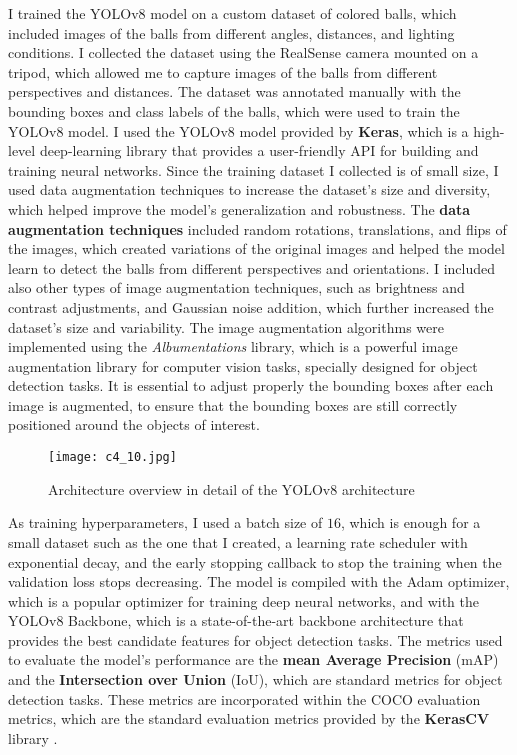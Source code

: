 I trained the YOLOv8 model on a custom dataset of colored balls, which included images of the balls
from different angles, distances, and lighting conditions. I collected the dataset using the RealSense camera mounted
on a tripod, which allowed me to capture images of the balls from different perspectives and distances. The dataset
was annotated manually with the bounding boxes and class labels of the balls, which were used to train the YOLOv8 model.
I used the YOLOv8 model provided by \textbf{Keras}, which is a high-level deep-learning library that provides a user-friendly
API for building and training neural networks. Since the training dataset I collected is of small size,
I used data augmentation techniques to increase the dataset's size and diversity, which helped improve the model's
generalization and robustness. The \textbf{data augmentation techniques} included random rotations, translations, and flips
of the images, which created variations of the original images and helped the model learn to detect the balls
from different perspectives and orientations. I included also other types of image augmentation techniques, such as
brightness and contrast adjustments, and Gaussian noise addition, which further increased the dataset's
size and variability. The image augmentation algorithms were implemented using the \textit{Albumentations} library,
which is a powerful image augmentation library for computer vision tasks, specially designed for 
object detection tasks. It is essential to adjust properly the bounding boxes after each image
is augmented, to ensure that the bounding boxes are still correctly positioned around the objects of interest.

\begin{figure}[t]
    \centering
    \texttt{[image: c4\_10.jpg]}
    \caption{Architecture overview in detail of the YOLOv8 architecture}
    \label{fig:yolov8}
\end{figure}

As training hyperparameters, I used a batch size of $16$, which is enough for a small dataset such as the one
that I created, a learning rate scheduler with exponential decay, and the early stopping callback to stop the training
when the validation loss stops decreasing. The model is compiled with the Adam optimizer, which is a popular optimizer
for training deep neural networks, and with the YOLOv8 Backbone, which is a state-of-the-art backbone architecture
that provides the best candidate features for object detection tasks. The metrics used to evaluate the model's performance
are the \textbf{mean Average Precision} (mAP) and the \textbf{Intersection over Union} (IoU),
which are standard metrics for object detection tasks. These metrics are incorporated within the COCO evaluation metrics,
which are the standard evaluation metrics provided by the \textbf{KerasCV} library \cite{wood2022kerascv}.

